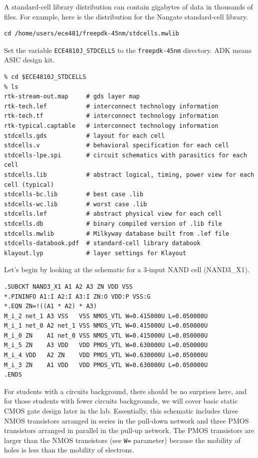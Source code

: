 \documentclass[a4paper,12pt,twoside]{article}
\begin{document}
A standard-cell library distribution can contain gigabytes of data in thousands of files. For example, here is the distribution for the Nangate standard-cell library.
\begin{verbatim}
cd /home/users/ece481/freepdk-45nm/stdcells.mwlib
\end{verbatim}
Set the variable \texttt{ECE4810J\_STDCELLS} to the \texttt{freepdk-45nm} directory. ADK means ASIC design kit.
\begin{verbatim}
% cd $ECE4810J_STDCELLS
% ls
rtk-stream-out.map     # gds layer map
rtk-tech.lef           # interconnect technology information
rtk-tech.tf            # interconnect technology information
rtk-typical.captable   # interconnect technology information
stdcells.gds           # layout for each cell
stdcells.v             # behavioral specification for each cell
stdcells-lpe.spi       # circuit schematics with parasitics for each cell
stdcells.lib           # abstract logical, timing, power view for each cell (typical)
stdcells-bc.lib        # best case .lib
stdcells-wc.lib        # worst case .lib
stdcells.lef           # abstract physical view for each cell
stdcells.db            # binary compiled version of .lib file
stdcells.mwlib         # Milkyway database built from .lef file
stdcells-databook.pdf  # standard-cell library databook
klayout.lyp            # layer settings for Klayout
\end{verbatim}
Let’s begin by looking at the schematic for a 3-input NAND cell (NAND3\_X1).
\begin{verbatim}
.SUBCKT NAND3_X1 A1 A2 A3 ZN VDD VSS
*.PININFO A1:I A2:I A3:I ZN:O VDD:P VSS:G
*.EQN ZN=!((A1 * A2) * A3)
M_i_2 net_1 A3 VSS   VSS NMOS_VTL W=0.415000U L=0.050000U
M_i_1 net_0 A2 net_1 VSS NMOS_VTL W=0.415000U L=0.050000U
M_i_0 ZN    A1 net_0 VSS NMOS_VTL W=0.415000U L=0.050000U
M_i_5 ZN    A3 VDD   VDD PMOS_VTL W=0.630000U L=0.050000U
M_i_4 VDD   A2 ZN    VDD PMOS_VTL W=0.630000U L=0.050000U
M_i_3 ZN    A1 VDD   VDD PMOS_VTL W=0.630000U L=0.050000U
.ENDS
\end{verbatim}
For students with a circuits background, there should be no surprises here, and for those students with fewer circuits backgrounds, we will cover basic static CMOS gate design later in the lab. Essentially, this schematic includes three NMOS transistors arranged in series in the pull-down network and three PMOS transistors arranged in parallel in the pull-up network. The PMOS transistors are larger than the NMOS transistors (see \texttt{W=} parameter) because the mobility of holes is less than the mobility of electrons.
\end{document}
